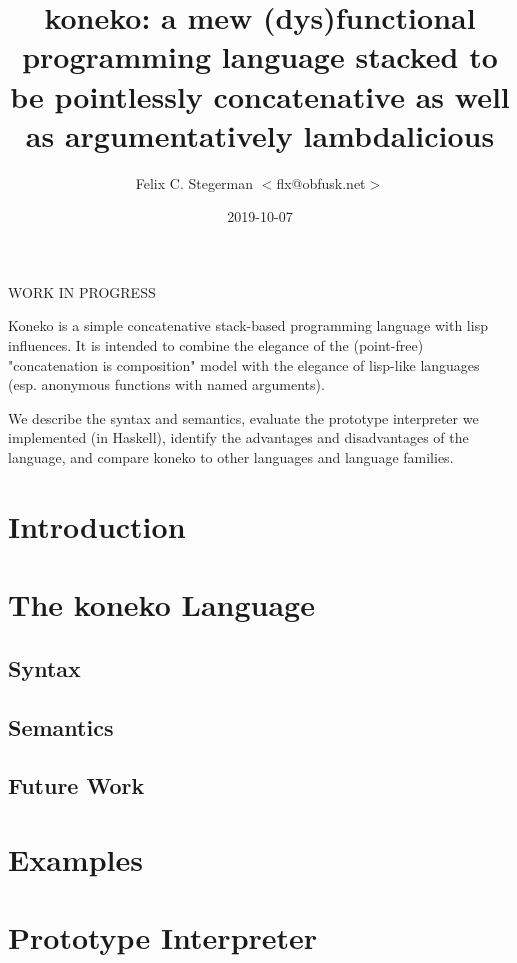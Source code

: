 \documentclass[a4paper,twocolumn]{article}
\title{
  koneko: a mew (dys)functional programming language stacked to be
  pointlessly concatenative as well as argumentatively lambdalicious
}
\author{Felix C. Stegerman $<$flx@obfusk.net$>$}
\date{2019-10-07}
\begin{document}
\maketitle

WORK IN PROGRESS %

\abstract

Koneko is a simple concatenative stack-based programming language with
lisp influences.  It is intended to combine the elegance of the
(point-free) "concatenation is composition" model with the elegance of
lisp-like languages (esp. anonymous functions with named arguments).

We describe the syntax and semantics, evaluate the prototype
interpreter we implemented (in Haskell), identify the advantages and
disadvantages of the language, and compare koneko to other languages
and language families.

\section{Introduction}



\section{The koneko Language}

\subsection*{Syntax}

\subsection*{Semantics}

\subsection*{Future Work}

\section{Examples}

\section{Prototype Interpreter}
\end{document}
